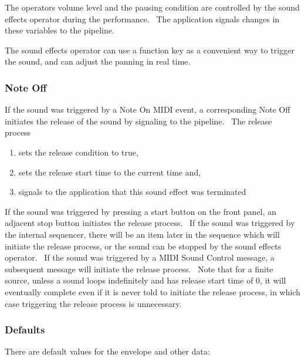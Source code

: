 \documentclass[letterpaper]{article}
\newcommand\liststyleLxiii{%
\renewcommand\theenumi{\arabic{enumi}}
\renewcommand\theenumii{\alph{enumii}}
\renewcommand\labelenumi{ \theenumi.}
\renewcommand\labelenumii{ \theenumii)}
\renewcommand\labelitemi{•}
\renewcommand\labelitemii{•}
}
\begin{document}
The operator{\textquotesingle}s volume level and the pausing condition
are controlled by the sound effects operator during the performance.
\ The application signals changes in these variables to the pipeline.
\ 

The sound effects operator can use a function key as a convenient way to
trigger the sound, and can adjust the panning in real time.

\subsubsection{Note Off}
If the sound was triggered by a Note On MIDI event, a corresponding Note
Off initiates the release of the sound by signaling to the pipeline.
\ The release process

\liststyleLxiii
\begin{enumerate}
\item sets the release condition to true, 
\item sets the release start time to the current time and, 
\item signals to the application that this sound effect was terminated
\ 
\end{enumerate}
If the sound was triggered by pressing a start button on the front
panel, an adjacent stop button initiates the release process. \ If the
sound was triggered by the internal sequencer, there will be an item
later in the sequence which will initiate the release process, or the
sound can be stopped by the sound effects operator. \ If the sound was
triggered by a MIDI Sound Control message, a subsequent message will
initiate the release process. \ Note that for a finite source, unless a
sound loops indefinitely and has release start time of 0, it will
eventually complete even if it is never told to initiate the release
process, in which case triggering the release process is unnecessary.

\subsubsection{Defaults}
There are default values for the envelope and other data:
\end{document}
